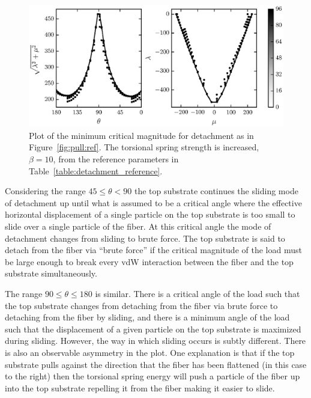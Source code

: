 {   \begin{figure}[t]
      \begin{center}
         \includegraphics{./fig/ch3/pull/b10/grid.eps}
      \end{center}      
      \caption{Plot of the minimum critical magnitude for detachment as in Figure~\ref{fig:pull:ref}. The torsional spring strength is increased, $\beta=10$, from the reference parameters in Table~\ref{table:detachment_reference}.
      \label{fig:pull:b10}}
   \end{figure}

Considering the range $45 \leq \theta < 90$ the top substrate continues the sliding mode of detachment up until what is assumed to be a critical angle where the effective horizontal displacement of a single particle on the top substrate is too small to slide over a single particle of the fiber. At this critical angle the mode of detachment changes from sliding to brute force. The top substrate is said to detach from the fiber via ``brute force'' if the critical magnitude of the load must be large enough to break every vdW interaction between the fiber and the top substrate simultaneously.

The range $90 \leq \theta \leq 180$ is similar. There is a critical angle of the load such that the top substrate changes from detaching from the fiber via brute force to detaching from the fiber by sliding, and there is a minimum angle of the load such that the displacement of a given particle on the top substrate is maximized during sliding. However, the way in which sliding occurs is subtly different. There is also an observable asymmetry in the plot. One explanation is that if the top substrate pulls against the direction that the fiber has been flattened (in this case to the right) then the torsional spring energy will push a particle of the fiber up into the top substrate repelling it from the fiber making it easier to slide.

}
